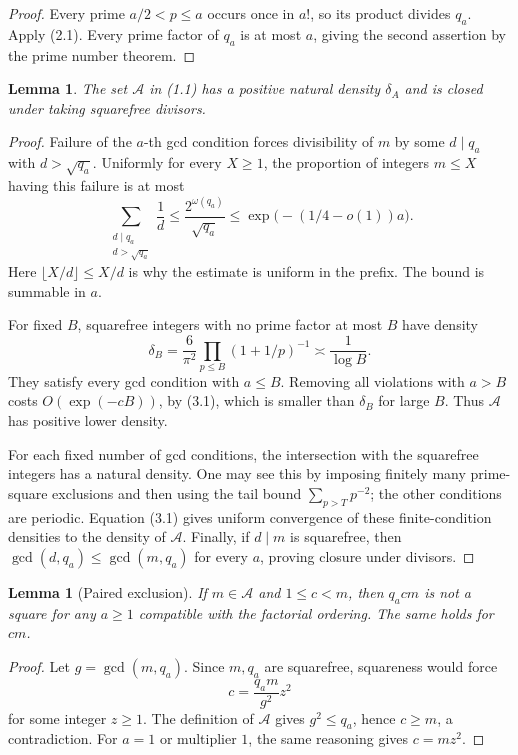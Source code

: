 \documentclass[letterpaper]{article}
\newtheorem{lemma}[theorem]{Lemma}
\theoremstyle{definition}
\theoremstyle{remark}
\numberwithin{equation}{section}
\begin{document}
\begin{proof}
Every prime $a/2<p\le a$ occurs once in $a!$, so its product divides $q_a$. Apply (2.1). Every
prime factor of $q_a$ is at most $a$, giving the second assertion by the prime number theorem.
\end{proof}

\begin{lemma}
The set $\mathcal A$ in (1.1) has a positive natural density $\delta_A$ and is closed under taking
squarefree divisors.
\end{lemma}

\begin{proof}
Failure of the $a$-th gcd condition forces divisibility of $m$ by some $d\mid q_a$ with $d>\sqrt{q_a}$.
Uniformly for every $X\ge 1$, the proportion of integers $m\le X$ having this failure is at most
\begin{equation}
  \sum_{\substack{d\mid q_a\\ d>\sqrt{q_a}}}\frac1d\le\frac{2^{\omega(q_a)}}{\sqrt{q_a}}
  \le\exp\bigl(-(1/4-o(1))a\bigr).
\end{equation}
Here $\lfloor X/d\rfloor\le X/d$ is why the estimate is uniform in the prefix. The bound is summable in $a$.

For fixed $B$, squarefree integers with no prime factor at most $B$ have density
\[
  \delta_B=\frac{6}{\pi^2}\prod_{p\le B}(1+1/p)^{-1}\asymp\frac{1}{\log B}.
\]
They satisfy every gcd condition with $a\le B$. Removing all violations with $a>B$ costs
$O(\exp(-cB))$, by (3.1), which is smaller than $\delta_B$ for large $B$. Thus $\mathcal A$ has positive lower density.

For each fixed number of gcd conditions, the intersection with the squarefree integers has a
natural density. One may see this by imposing finitely many prime-square exclusions and then
using the tail bound $\sum_{p>T}p^{-2}$; the other conditions are periodic. Equation (3.1) gives uniform
convergence of these finite-condition densities to the density of $\mathcal A$. Finally, if $d\mid m$ is squarefree,
then $\gcd(d,q_a)\le\gcd(m,q_a)$ for every $a$, proving closure under divisors.
\end{proof}

\begin{lemma}[Paired exclusion]
If $m\in\mathcal A$ and $1\le c<m$, then $q_acm$ is not a square for any
$a\ge 1$ compatible with the factorial ordering. The same holds for $cm$.
\end{lemma}

\begin{proof}
Let $g=\gcd(m,q_a)$. Since $m,q_a$ are squarefree, squareness would force
\[
  c=\frac{q_am}{g^2}z^2
\]
for some integer $z\ge 1$. The definition of $\mathcal A$ gives $g^2\le q_a$, hence $c\ge m$, a contradiction. For
$a=1$ or multiplier $1$, the same reasoning gives $c=mz^2$.
\end{proof}
\end{document}
